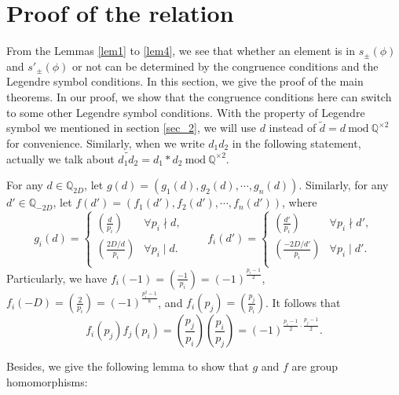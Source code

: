 \documentclass{amsart}
\numberwithin{equation}{section}
\theoremstyle{plain}
\theoremstyle{definition}
\newcommand{\QQ}{\mathbb Q}
\renewcommand{\mod}[1]{\ \mathrm{mod}\ #1}  %
\begin{document}
\section{Proof of the relation}\label{sec_pr}

From the Lemmas \ref{lem1} to \ref{lem4}, we see that whether an element is in $s_{\pm}(\phi)$ and $s'_{\pm}(\phi)$ or not can be determined by the congruence conditions and the Legendre symbol conditions. In this section, we give the proof of the main theorems.
In our proof, we show that the congruence conditions here can switch to some other Legendre symbol conditions. With the property of Legendre symbol we mentioned in section \ref{sec_2}, we will use $d$ instead of $\widetilde{d} = d \mod  \QQ^{\times 2}$ for convenience. Similarly, when we write $d_1d_2$ in the following statement, actually we talk about $\widetilde{d_1d_2} = d_1*d_2 \mod  \QQ^{\times 2}$.

For any $d \in \mathbb{Q}_{2D}$, let $g(d) = (g_{1}(d),g_{2}(d),\cdots,g_{n}(d))$. Similarly, for any $d' \in \mathbb{Q}_{-2D}$,
let $f(d') = (f_{1}(d'),f_{2}(d'),\cdots,f_{n}(d'))$, where
\begin{equation}\label{eq:array}
g_{i}(d) =\left\{
\begin{array}{ll}
(\frac{d}{p_i})        &\forall p_{i} \nmid d,\\
(\frac{2D/d}{p_i})      &\forall p_{i} \mid d.\\
\end{array}
\right.
\hspace{2em}
f_{i}(d') =\left\{\begin{array}{ll}
(\frac{d'}{p_i})        &\forall p_{i} \nmid d',\\
(\frac{-2D/d'}{p_i})      &\forall p_{i} \mid d'.\\
\end{array}\right.
\end{equation}
Particularly, we have $f_{i}(-1) = (\frac{-1}{p_i})=(-1)^{\frac{p_i - 1}{2}}$, $f_{i}(-D) = (\frac{2}{p_i}) = (-1)^{\frac{p_i^2 - 1}{8}}$, and $f_{i}(p_j) = (\frac{p_j}{p_i})$. It follows that 
\begin{equation} \label{3.2}
  f_{i}(p_j)f_{j}(p_i) =(\frac{p_j}{p_i})(\frac{p_i}{p_j}) = (-1)^{\frac{ p_i - 1}{2}\cdot \frac{ p_j - 1}{2}}.  
\end{equation}

Besides, we give the  following lemma to show that $g$ and $f$ are group homomorphisms:
\end{document}
